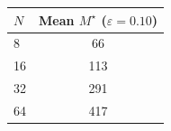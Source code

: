 \begin{tabular}{lc}
\toprule
$N$ & Mean $M^\star$ ($\varepsilon=0.10$) \\
\midrule
8 & 66 \\
16 & 113 \\
32 & 291 \\
64 & 417 \\
\bottomrule
\end{tabular}

